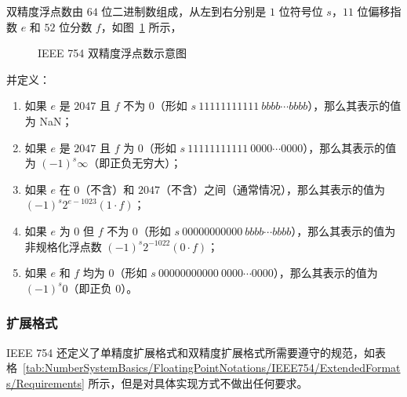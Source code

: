             双精度浮点数由 $64$ 位二进制数组成，从左到右分别是 $1$ 位符号位 $s$，$11$ 位偏移指数 $e$ 和 $52$ 位分数 $f$，如图~\ref{fig:NumberSystemBasics/FloatingPointNotations/IEEE754/BasicFormats/Double} 所示，
            \begin{figure}
                \centering
                \caption{IEEE 754 双精度浮点数示意图}
                \label{fig:NumberSystemBasics/FloatingPointNotations/IEEE754/BasicFormats/Double}
            \end{figure}

            并定义：
            \begin{enumerate}
                \item 如果 $e$ 是 $2047$ 且 $f$ 不为 $0$（形如 $s\ 11111111111\ bbbb \cdots bbbb$），那么其表示的值为 NaN；
                \item 如果 $e$ 是 $2047$ 且 $f$ 为 $0$（形如 $s\ 11111111111\ 0000 \cdots 0000$），那么其表示的值为 $(-1)^s\infty$（即正负无穷大）；
                \item 如果 $e$ 在 $0$（不含）和 $2047$（不含）之间（通常情况），那么其表示的值为 $(-1)^s2^{e-1023}(1 \cdot f)$；
                \item 如果 $e$ 为 $0$ 但 $f$ 不为 $0$（形如 $s\ 00000000000\ bbbb \cdots bbbb$），那么其表示的值为非规格化浮点数 $(-1)^s2^{-1022}(0 \cdot f)$；
                \item 如果 $e$ 和 $f$ 均为 $0$（形如 $s\ 00000000000\ 0000 \cdots 0000$），那么其表示的值为 $(-1)^s0$（即正负 $0$）。
            \end{enumerate}

        \subsubsection{扩展格式}\label{subsubsec:NumberSystemBasics/FloatingPointNotations/IEEE754/ExtendedFormats}
            IEEE 754 还定义了单精度扩展格式和双精度扩展格式所需要遵守的规范，如表格~\ref{tab:NumberSystemBasics/FloatingPointNotations/IEEE754/ExtendedFormats/Requirements} 所示，但是对具体实现方式不做出任何要求。

